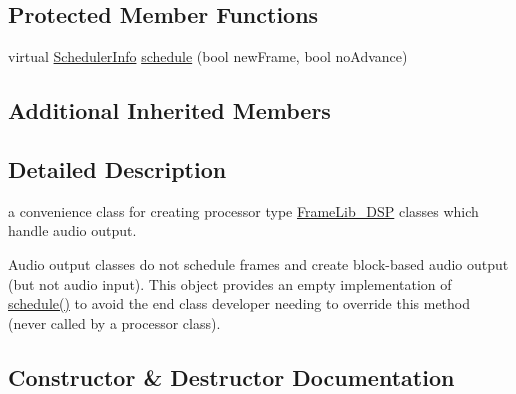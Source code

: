 \subsection*{Protected Member Functions}
\begin{DoxyCompactItemize}
\item 
virtual \hyperlink{struct_frame_lib___d_s_p_1_1_scheduler_info}{Scheduler\+Info} \hyperlink{class_frame_lib___audio_output_a39e97cc3e92147465cf1f6c267de185d}{schedule} (bool new\+Frame, bool no\+Advance)
\end{DoxyCompactItemize}
\subsection*{Additional Inherited Members}


\subsection{Detailed Description}
a convenience class for creating processor type \hyperlink{class_frame_lib___d_s_p}{Frame\+Lib\+\_\+\+D\+SP} classes which handle audio output. 

Audio output classes do not schedule frames and create block-\/based audio output (but not audio input). This object provides an empty implementation of \hyperlink{class_frame_lib___audio_output_a39e97cc3e92147465cf1f6c267de185d}{schedule()} to avoid the end class developer needing to override this method (never called by a processor class). 

\subsection{Constructor \& Destructor Documentation}
\mbox{\label{class_frame_lib___audio_output_a5bbfeb85ab62136e67e147e65e6b78f5}} 
